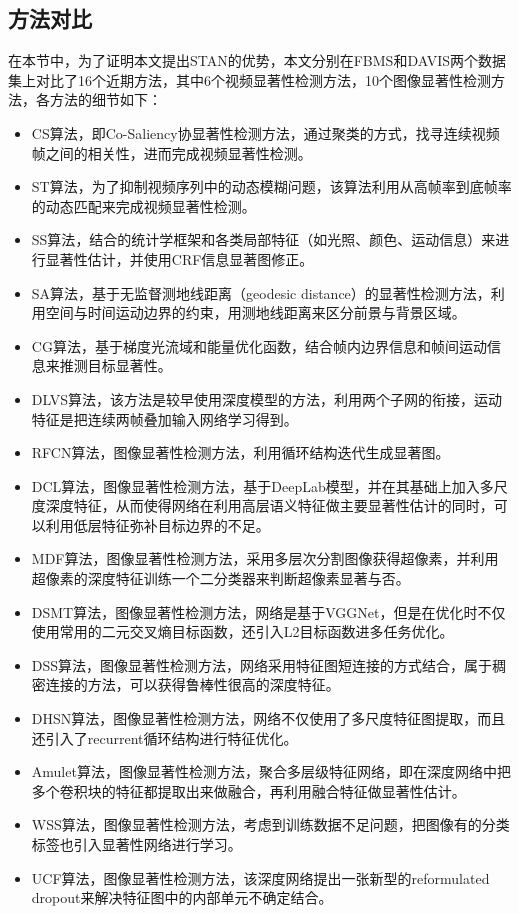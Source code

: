 \subsection{方法对比}
在本节中，为了证明本文提出STAN的优势，本文分别在FBMS和DAVIS两个数据集上对比了16个近期方法，其中6个视频显著性检测方法，10个图像显著性检测方法，各方法的细节如下：

\begin{itemize}
  \item CS算法\cite{fu2013cluster}，即Co-Saliency协显著性检测方法，通过聚类的方式，找寻连续视频帧之间的相关性，进而完成视频显著性检测。
  \item ST算法\cite{zhou2014time}，为了抑制视频序列中的动态模糊问题，该算法利用从高帧率到底帧率的动态匹配来完成视频显著性检测。
  \item SS算法\cite{rahtu2010segmenting}，结合的统计学框架和各类局部特征（如光照、颜色、运动信息）来进行显著性估计，并使用CRF信息显著图修正。
  \item SA算法\cite{wang2015saliency}，基于无监督测地线距离（geodesic distance）的显著性检测方法，利用空间与时间运动边界的约束，用测地线距离来区分前景与背景区域。
  \item CG算法\cite{wang2015consistent}，基于梯度光流域和能量优化函数，结合帧内边界信息和帧间运动信息来推测目标显著性。
  \item DLVS算法\cite{8047320}，该方法是较早使用深度模型的方法，利用两个子网的衔接，运动特征是把连续两帧叠加输入网络学习得到。
  \item RFCN算法\cite{wang2016saliency}，图像显著性检测方法，利用循环结构迭代生成显著图。
  \item DCL算法\cite{li2016deep}，图像显著性检测方法，基于DeepLab模型\cite{chen14semantic}，并在其基础上加入多尺度深度特征，从而使得网络在利用高层语义特征做主要显著性估计的同时，可以利用低层特征弥补目标边界的不足。
  \item MDF算法\cite{li2016visual}，图像显著性检测方法，采用多层次分割图像获得超像素，并利用超像素的深度特征训练一个二分类器来判断超像素显著与否。
  \item DSMT算法\cite{li2016deepsaliency}，图像显著性检测方法，网络是基于VGGNet，但是在优化时不仅使用常用的二元交叉熵目标函数，还引入L2目标函数进多任务优化。
  \item DSS算法\cite{DSSalCVPR2017}，图像显著性检测方法，网络采用特征图短连接的方式结合，属于稠密连接的方法，可以获得鲁棒性很高的深度特征。
  \item DHSN算法\cite{liu2016dhsnet}，图像显著性检测方法，网络不仅使用了多尺度特征图提取，而且还引入了recurrent循环结构进行特征优化。
  \item Amulet算法\cite{Zhang_2017_ICCV_Amulet}，图像显著性检测方法，聚合多层级特征网络，即在深度网络中把多个卷积块的特征都提取出来做融合，再利用融合特征做显著性估计。
  \item WSS算法\cite{Wang2017Learning}，图像显著性检测方法，考虑到训练数据不足问题，把图像有的分类标签也引入显著性网络进行学习。
  \item UCF算法\cite{Zhang_2017_ICCV_UCF}，图像显著性检测方法，该深度网络提出一张新型的reformulated dropout来解决特征图中的内部单元不确定结合。
\end{itemize}

